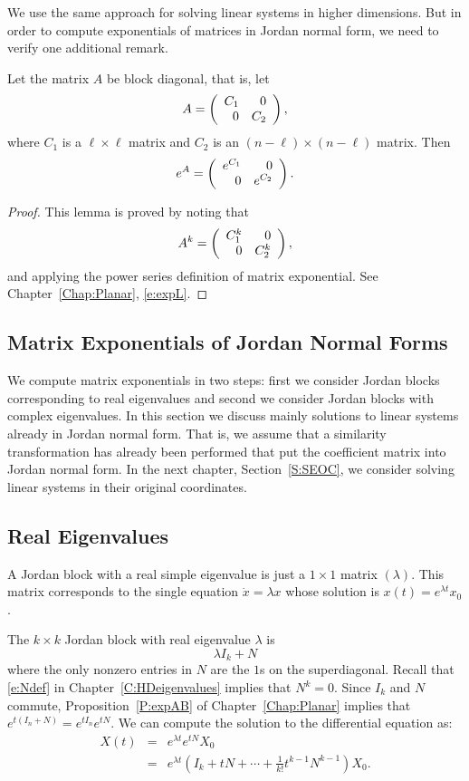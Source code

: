 \documentclass{ximera}
\begin{document}
We use the same approach for solving linear systems in higher dimensions.
But in order to compute exponentials of matrices in Jordan normal form,
we need to verify one additional remark.

\begin{lemma}  \label{T:blocks}
Let the matrix $A$ be block diagonal, that is, let
\[
A=\left(\begin{array}{rr} C_1 & 0\\ 0 &C_2\end{array}\right),
\]
where $C_1$ is a $\ell\times \ell$ matrix and $C_2$ is an 
$(n-\ell)\times(n-\ell)$ matrix.  Then 
\[
e^A = \left(\begin{array}{rr} e^{C_1} & 0\\ 0 &e^{C_2}\end{array}\right).
\]
\end{lemma}

\begin{proof}  This lemma is proved by noting that
\[
A^k = \left(\begin{array}{rr} C_1^k & 0\\ 0 &C_2^k\end{array}\right),
\]
and applying the power series definition of matrix exponential.  
See Chapter~\ref{Chap:Planar}, \eqref{e:expL}. \end{proof}

\subsection*{Matrix Exponentials of Jordan Normal Forms}

We compute matrix exponentials in two steps: first we consider 
Jordan blocks corresponding to real eigenvalues and second we consider
Jordan blocks with complex eigenvalues.  In this section we discuss mainly
solutions to linear systems already in Jordan normal form.  That is, we 
assume that a similarity transformation has already been performed that put
the coefficient
matrix into Jordan normal form.  In the next chapter, Section~\ref{S:SEOC},
we consider solving linear systems in their original coordinates. 

\subsection*{Real Eigenvalues}

A Jordan block with a real simple eigenvalue is just a $1\times 1$ matrix
$(\lambda)$. This matrix corresponds to the single equation 
$\dot{x}=\lambda x$ whose solution is $x(t) = e^{\lambda t}x_0$.

The $k\times k$ Jordan block with real 
eigenvalue $\lambda$ is 
\[
\lambda I_k + N
\]
where the only nonzero entries in $N$ are the $1$s on the superdiagonal.  
Recall that \eqref{e:Ndef} in Chapter~\ref{C:HDeigenvalues} implies that 
$N^k=0$.  Since $I_k$ and $N$ commute, Proposition~\ref{P:expAB} of 
Chapter~\ref{Chap:Planar} implies that $e^{t(I_n+N)}=e^{tI_n}e^{tN}$.  We 
can compute the solution to the differential equation as:
\begin{eqnarray}
X(t) & = & e^{\lambda t}e^{tN}X_0 \nonumber \\
& = & e^{\lambda t}\left(I_k+tN+\cdots+\frac{1}{k!}t^{k-1}N^{k-1}\right)X_0.
\label{e:expsoln}
\end{eqnarray}
\end{document}
